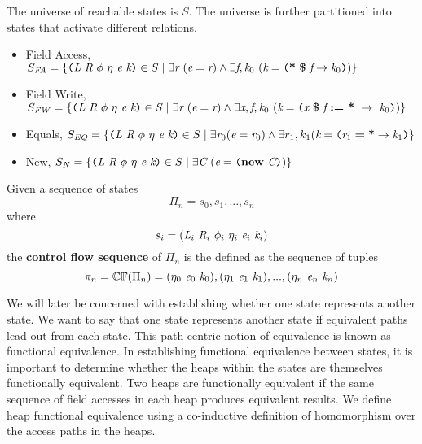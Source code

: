 \begin{definition}
The universe of reachable states is $S$. The universe is further partitioned into states that activate different relations.
\begin{itemize}
\item Field Access, $S_\mathit{FA} = \{\texttt{(} \emph{L}\ \emph{R}\ \phi\ \eta\ \emph{e}\ \emph{k} \texttt{)} \in S \mid \exists \emph{r}\ (\emph{e} = \emph{r}) \wedge \exists \emph{f},\emph{k}_0\ (\emph{k} = \texttt{(} \textbf{*}\ \textbf{\$}\ \emph{f} \rightarrow \emph{k}_0\texttt{)}) \}$
\item Field Write,  $S_\mathit{FW} = \{\lp \cfgnt{L}\ \cfgnt{R}\ \phi\ \eta\ \cfgnt{e}\ \cfgnt{k} \rp \in S \mid \exists \cfgnt{r}\ (\cfgnt{e} = \cfgnt{r}) \wedge \exists \cfgnt{x},\cfgnt{f},\cfgnt{k}_0\ (\cfgnt{k} = \lp \cfgnt{x}\ \cfgt{\$}\ \cfgnt{f}\ \cfgt{:=}\ \cfgt{*}\ \rightarrow\ \cfgnt{k}_0\rp) \}$
\item Equals, $S_\mathit{EQ} = \{\texttt{(} \emph{L}\ \emph{R}\ \phi\ \eta\ \emph{e}\ \emph{k} \texttt{)} \in S \mid \exists \emph{r}_0 (\emph{e} = \emph{r}_0) \wedge \exists r_1, k_1(\emph{k} = \texttt{(} \emph{r}_1\; \textbf{=}\; \textbf{*} \rightarrow \emph{k}_1\texttt{)} \}$
\item New, $S_\mathit{N} = \{\lp \cfgnt{L}\ \cfgnt{R}\ \phi\ \eta\ \cfgnt{e}\ \cfgnt{k} \rp \in S \mid \exists \cfgnt{C}\ (\cfgnt{e} = \lp \cfgt{new}\ \cfgnt{C}\rp) \}$
\end{itemize} 
\end{definition}


\begin{definition}
Given a sequence of states $$\Pi_n = s_0,s_1,...,s_n$$ where $$s_i = (\cfgnt{L}_i\ \cfgnt{R}_i\ \phi_i\ \eta_i\ \cfgnt{e}_i\ \cfgnt{k}_i )$$ the \textbf{control flow sequence} of $\Pi_n$ is the defined as the sequence of tuples $$ \pi_n = \mathbb{CF}(\Pi_n) = (\eta_0\ \cfgnt{e}_0\ \cfgnt{k}_0),(\eta_1\ \cfgnt{e}_1\ \cfgnt{k}_1),...,(\eta_n\ \cfgnt{e}_n\ \cfgnt{k}_n)$$
\end{definition}

We will later be concerned with establishing whether one state
represents another state. We want to say that one state represents
another state if equivalent paths lead out from each state. This
path-centric notion of equivalence is known as functional
equivalence. In establishing functional equivalence between states, it
is important to determine whether the heaps within the states are
themselves functionally equivalent. Two heaps are functionally
equivalent if the same sequence of field accesses in each heap
produces equivalent results. We define heap functional equivalence
using a co-inductive definition of homomorphism over the access paths
in the heaps.


